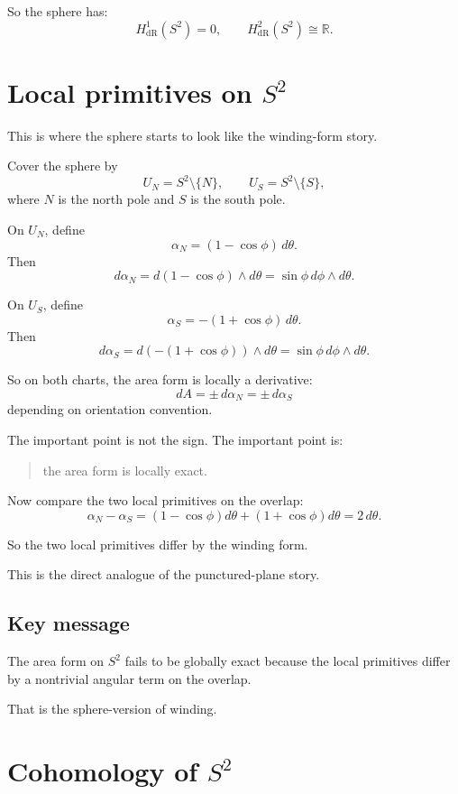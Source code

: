 \documentclass[11pt]{article}
\begin{document}
	So the sphere has:
	\[
	H^1_{\mathrm{dR}}(S^2)=0,
	\qquad
	H^2_{\mathrm{dR}}(S^2)\cong \mathbb{R}.
	\]
	
	\section{Local primitives on \(S^2\)}
	
	This is where the sphere starts to look like the winding-form story.
	
	Cover the sphere by
	\[
	U_N=S^2\setminus\{N\},
	\qquad
	U_S=S^2\setminus\{S\},
	\]
	where \(N\) is the north pole and \(S\) is the south pole.
	
	On \(U_N\), define
	\[
	\alpha_N=(1-\cos\phi)\,d\theta.
	\]
	Then
	\[
	d\alpha_N
	=
	d(1-\cos\phi)\wedge d\theta
	=
	\sin\phi\,d\phi\wedge d\theta.
	\]
	
	On \(U_S\), define
	\[
	\alpha_S=-(1+\cos\phi)\,d\theta.
	\]
	Then
	\[
	d\alpha_S
	=
	d(-(1+\cos\phi))\wedge d\theta
	=
	\sin\phi\,d\phi\wedge d\theta.
	\]
	
	So on both charts, the area form is locally a derivative:
	\[
	dA = \pm\, d\alpha_N = \pm\, d\alpha_S
	\]
	depending on orientation convention.
	
	The important point is not the sign. The important point is:
	
	\begin{quote}
		the area form is locally exact.
	\end{quote}
	
	Now compare the two local primitives on the overlap:
	\[
	\alpha_N-\alpha_S
	=
	(1-\cos\phi)d\theta+(1+\cos\phi)d\theta
	=
	2\,d\theta.
	\]
	
	So the two local primitives differ by the winding form.
	
	This is the direct analogue of the punctured-plane story.
	
	\subsection{Key message}
	
	The area form on \(S^2\) fails to be globally exact because the local primitives differ by a nontrivial angular term on the overlap.
	
	That is the sphere-version of winding.
	
	\section{Cohomology of \(S^2\)}
	
\end{document}
